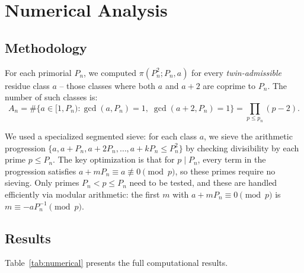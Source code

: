 \documentclass[11pt]{article}
\begin{document}
\section{Numerical Analysis}

\subsection{Methodology}

For each primorial $P_n$, we computed $\pi(P_n^2; P_n, a)$ for every
\emph{twin-admissible} residue class $a$ -- those classes where both
$a$ and $a+2$ are coprime to $P_n$. The number of such classes is:
\begin{equation}
A_n = \#\{a \in [1, P_n) : \gcd(a, P_n)=1,\;\gcd(a+2, P_n)=1\}
= \prod_{p \leq p_n}(p-2).
\end{equation}

We used a specialized segmented sieve: for each class $a$, we sieve the
arithmetic progression $\{a, a+P_n, a+2P_n, \ldots, a+kP_n \leq P_n^2\}$
by checking divisibility by each prime $p \leq P_n$. The key optimization
is that for $p \mid P_n$, every term in the progression satisfies
$a + m P_n \equiv a \not\equiv 0 \pmod p$, so these primes require no
sieving. Only primes $P_n < p \leq P_n$ need to be tested, and these are
handled efficiently via modular arithmetic: the first $m$ with
$a + mP_n \equiv 0 \pmod p$ is $m \equiv -a P_n^{-1} \pmod p$.

\subsection{Results}

Table~\ref{tab:numerical} presents the full computational results.
\end{document}
